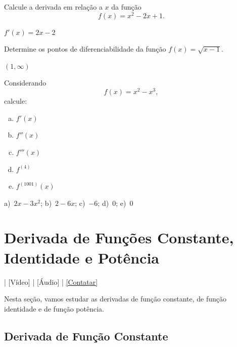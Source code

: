 \begin{exer}
  Calcule a derivada em relação a $x$ da função
  \begin{equation}
    f(x) = x^2 - 2x + 1.
  \end{equation}
\end{exer}
\begin{resp}
  $f'(x) = 2x - 2$
\end{resp}

\begin{exer}
  Determine os pontos de diferenciabilidade da função $f(x) = \sqrt{x-1}$.
\end{exer}
\begin{resp}
  $(1, \infty)$
\end{resp}

\begin{exer}
  Considerando
  \begin{equation}
    f(x) = x^2-x^3,
  \end{equation}
  calcule:
  \begin{enumerate}[a)]
  \item $f'(x)$
  \item $f''(x)$
  \item $f'''(x)$
  \item $f^{(4)}$
  \item $f^{(1001)}(x)$
  \end{enumerate}
\end{exer}
\begin{resp}
  a)~$2x-3x^2$; b)~$2-6x$; c)~$-6$; d)~$0$; e)~$0$
\end{resp}

\section{Derivada de Funções Constante, Identidade e Potência}\label{cap_deriv_sec_funcip}

\begin{flushright}
  [YouTube] | [Vídeo] | [Áudio] | \href{https://phkonzen.github.io/notas/contato.html}{[Contatar]}
\end{flushright}

Nesta seção, vamos estudar as derivadas de função constante, de função identidade e de função potência.

\subsection{Derivada de Função Constante}

